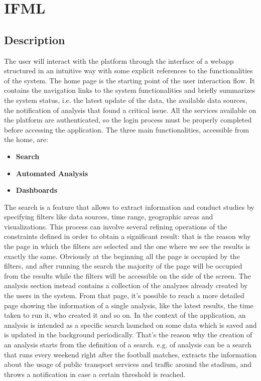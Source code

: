 \documentclass[../main.tex]{subfiles}
\begin{document}
    \chapter{IFML}\label{ch:ifml}
    \section{Description}\label{sec:description}
    The user will interact with the platform through the interface of a webapp structured in an intuitive way with some explicit references to the functionalities of the system. The home page is the starting point of the user interaction flow. It contains the navigation links to the system functionalities and briefly summarizes the system status, i.e. the latest update of the data, the available data sources, the notification of analysis that found a critical issue. All the services available on the platform are authenticated, so the login process must be properly completed before accessing the application.
    The three main functionalities, accessible from the home, are:
    \begin{itemize}
        \item \textbf{Search}
        \item \textbf{Automated Analysis}
        \item \textbf{Dashboards}
    \end{itemize}
    The search is a feature that allows to extract information and conduct studies by specifying filters like data sources, time range, geographic areas and visualizations. This process can involve several refining operations of the constraints defined in order to obtain a significant result: that is the reason why the page in which the filters are selected and the one where we see the results is exactly the same. Obviously at the beginning all the page is occupied by the filters, and after running the search the majority of the page will be occupied from the results while the filters will be accessible on the side of the screen.
    The analysis section instead contains a collection of the analyzes already created by the users in the system. From that page, it’s possible to reach a more detailed page showing the information of a single analysis, like the latest results, the time taken to run it, who created it and so on. In the context of the application, an analysis is intended as a specific search launched on some data which is saved and is updated in the background periodically. That’s the reason why the creation of an analysis starts from the definition of a search. e.g. of analysis can be a search that runs every weekend right after the football matches, extracts the information about the usage of public transport services and traffic around the stadium, and throws a notification in case a certain threshold is reached.
\end{document}
